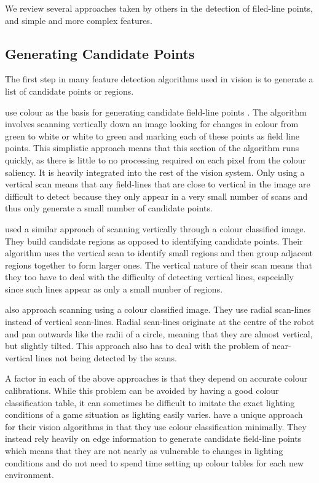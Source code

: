 \documentclass{article}
\begin{document}
We review several approaches taken by others in the detection of filed-line points, and simple and more complex features. 

\subsection{Generating Candidate Points} 
The first step in many feature detection algorithms used in vision is to generate a list of candidate points or regions.

\citeauthor{rUNSWift2010}  use colour as the basis for generating candidate field-line points . The algorithm involves scanning vertically down an image looking for changes in colour from green to white or white to green and marking each of these points as field line points. This simplistic approach means that this section of the algorithm runs quickly, as there is little to no processing required on each pixel from the colour saliency. It is heavily integrated into the rest of the vision system. Only using a vertical scan means that any field-lines that are close to vertical in the image are difficult to detect because they only appear in a very small number of scans and thus only generate a small number of candidate points.

\citeauthor{BHumanCodeRelease2010}  used a similar approach of scanning vertically through a colour classified image. They build candidate regions as opposed to identifying candidate points. Their algorithm uses the vertical scan to identify small regions and then group adjacent regions together to form larger ones. The vertical nature of their scan means that they too have to deal with the difficulty of detecting  vertical lines, especially since such lines appear as only a small number of regions.

\citeauthor{NaoDevils2010}  also approach scanning using a colour classified image. They use radial scan-lines instead of vertical scan-lines. Radial scan-lines originate at the centre of the robot and pan outwards like the radii of a circle, meaning that they are almost vertical, but slightly tilted. This approach also has to deal with the problem of near-vertical lines not being detected by the scans.

A factor in each of the above approaches is that they depend on accurate colour calibrations. While this problem can be avoided by having a good colour classification table, it can sometimes be difficult to imitate the exact lighting conditions of a game situation as lighting easily varies. \citeauthor{HTWK2011}  have a unique approach for their vision algorithms in that they use colour classification minimally. They instead rely heavily on edge information to generate candidate field-line points which means that they are not nearly as vulnerable to changes in lighting conditions and do not need to spend time setting up colour tables for each new environment.
\end{document}
